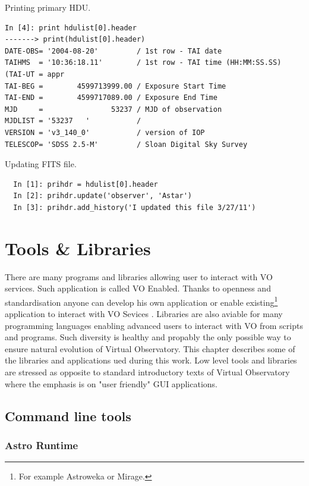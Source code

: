 Printing primary HDU.

\begin{lstlisting}
In [4]: print hdulist[0].header
-------> print(hdulist[0].header)
DATE-OBS= '2004-08-20'         / 1st row - TAI date                             
TAIHMS  = '10:36:18.11'        / 1st row - TAI time (HH:MM:SS.SS) (TAI-UT = appr
TAI-BEG =        4599713999.00 / Exposure Start Time                            
TAI-END =        4599717089.00 / Exposure End Time                              
MJD     =                53237 / MJD of observation                             
MJDLIST = '53237   '           /                                                
VERSION = 'v3_140_0'           / version of IOP                                 
TELESCOP= 'SDSS 2.5-M'         / Sloan Digital Sky Survey
\end{lstlisting}

Updating FITS file.

\begin{lstlisting}
  In [1]: prihdr = hdulist[0].header
  In [2]: prihdr.update('observer', 'Astar')
  In [3]: prihdr.add_history('I updated this file 3/27/11')
\end{lstlisting}

\section{Tools \& Libraries}
There are many programs and libraries allowing user to interact with
VO services. Such application is called VO Enabled. Thanks to openness
and standardisation anyone can develop his own application or enable
existing\footnote{For example Astroweka or Mirage.} application to
interact with VO Sevices . Libraries are also aviable for many
programming languages enabling advanced users to interact with VO from
scripts and programs. Such diversity is healthy and propably the only
possible way to ensure natural evolution of Virtual Observatory. This
chapter describes some of the libraries and applications ued during
this work. Low level tools and libraries are stressed as opposite to
standard introductory texts of Virtual Observatory where the emphasis
is on "user friendly" GUI applications.


\subsection{Command line tools}
\subsubsection*{Astro Runtime}

